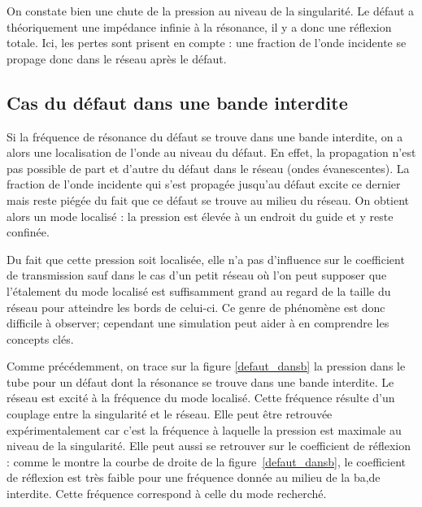 \bigskip
On constate bien une chute de la pression au niveau de la singularité. Le défaut a théoriquement une impédance infinie à la résonance, il y a donc une réflexion totale. Ici, les pertes sont prisent en compte : une fraction de l'onde incidente se propage donc dans le réseau après le défaut.



\subsection{Cas du défaut dans une bande interdite}

Si la fréquence de résonance du défaut se trouve dans une bande interdite, on a alors une localisation de l'onde au niveau du défaut. En effet, la propagation n'est pas possible de part et d'autre du défaut dans le réseau (ondes évanescentes). La fraction de l'onde incidente qui s'est propagée jusqu'au défaut excite ce dernier mais reste piégée du fait que ce défaut se trouve au milieu du réseau. On obtient alors un mode localisé : la pression est élevée à un endroit du guide et y reste confinée.
\bigskip


Du fait que cette pression soit localisée, elle n'a pas d'influence sur le coefficient de transmission sauf dans le cas d'un petit réseau où l'on peut supposer que l'étalement du mode localisé est suffisamment grand au regard de la taille du réseau pour atteindre les bords de celui-ci. Ce genre de phénomène est donc difficile à observer; cependant une simulation peut aider à en comprendre les concepts clés.
\bigskip

Comme précédemment, on trace sur la figure \ref{defaut_dansb} la pression dans le tube pour un défaut dont la résonance se trouve dans une bande interdite. Le réseau est excité à la fréquence du mode localisé. Cette fréquence résulte d'un couplage entre la singularité et le réseau. Elle peut être retrouvée expérimentalement car c'est la fréquence à laquelle la pression est maximale au niveau de la singularité. Elle peut aussi se retrouver sur le coefficient de réflexion : comme le montre la courbe de droite de la figure~\ref{defaut_dansb}, le coefficient de réflexion est très faible pour une fréquence donnée au milieu de la ba,de interdite. Cette fréquence correspond à celle du mode recherché.


